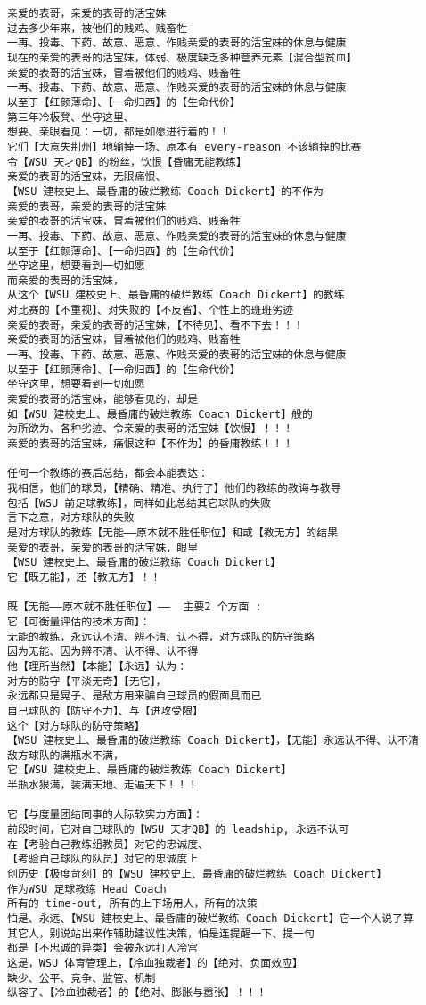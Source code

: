\documentclass[9pt, b5paper]{article}
\begin{document}
\begin{verbatim}
亲爱的表哥，亲爱的表哥的活宝妹
过去多少年来，被他们的贱鸡、贱畜牲
一再、投毒、下药、故意、恶意、作贱亲爱的表哥的活宝妹的休息与健康
现在的亲爱的表哥的活宝妹，体弱、极度缺乏多种营养元素【混合型贫血】
亲爱的表哥的活宝妹，冒着被他们的贱鸡、贱畜牲
一再、投毒、下药、故意、恶意、作贱亲爱的表哥的活宝妹的休息与健康
以至于【红颜薄命】、【一命归西】的【生命代价】
第三年冷板凳、坐守这里、
想要、亲眼看见：一切，都是如愿进行着的！！
它们【大意失荆州】地输掉一场、原本有 every-reason 不该输掉的比赛
令【WSU 天才QB】的粉丝，饮恨【昏庸无能教练】
亲爱的表哥的活宝妹，无限痛恨、
【WSU 建校史上、最昏庸的破烂教练 Coach Dickert】的不作为
亲爱的表哥，亲爱的表哥的活宝妹 
亲爱的表哥的活宝妹，冒着被他们的贱鸡、贱畜牲
一再、投毒、下药、故意、恶意、作贱亲爱的表哥的活宝妹的休息与健康
以至于【红颜薄命】、【一命归西】的【生命代价】
坐守这里，想要看到一切如愿
而亲爱的表哥的活宝妹，
从这个【WSU 建校史上、最昏庸的破烂教练 Coach Dickert】的教练
对比赛的【不重视】、对失败的【不反省】、个性上的班班劣迹
亲爱的表哥，亲爱的表哥的活宝妹，【不待见】、看不下去！！！
亲爱的表哥的活宝妹，冒着被他们的贱鸡、贱畜牲
一再、投毒、下药、故意、恶意、作贱亲爱的表哥的活宝妹的休息与健康
以至于【红颜薄命】、【一命归西】的【生命代价】
坐守这里，想要看到一切如愿
亲爱的表哥的活宝妹，能够看见的，却是
如【WSU 建校史上、最昏庸的破烂教练 Coach Dickert】般的
为所欲为、各种劣迹、令亲爱的表哥的活宝妹【饮恨】！！！
亲爱的表哥的活宝妹，痛恨这种【不作为】的昏庸教练！！！

任何一个教练的赛后总结，都会本能表达：
我相信，他们的球员，【精确、精准、执行了】他们的教练的教诲与教导
包括【WSU 前足球教练】，同样如此总结其它球队的失败
言下之意，对方球队的失败
是对方球队的教练【无能——原本就不胜任职位】和或【教无方】的结果
亲爱的表哥，亲爱的表哥的活宝妹，眼里
【WSU 建校史上、最昏庸的破烂教练 Coach Dickert】
它【既无能】，还【教无方】！！

既【无能——原本就不胜任职位】——  主要2 个方面 :
它【可衡量评估的技术方面】：
无能的教练，永远认不清、辨不清、认不得，对方球队的防守策略
因为无能、因为辨不清、认不得、认不得
他【理所当然】【本能】【永远】认为：
对方的防守【平淡无奇】【无它】，
永远都只是晃子、是敌方用来骗自己球员的假面具而已
自己球队的【防守不力】、与【进攻受限】
这个【对方球队的防守策略】
【WSU 建校史上、最昏庸的破烂教练 Coach Dickert】，【无能】永远认不得、认不清
敌方球队的满瓶水不满，
它【WSU 建校史上、最昏庸的破烂教练 Coach Dickert】
半瓶水狠满，装满天地、走遍天下！！！

它【与度量团结同事的人际软实力方面】：
前段时间，它对自己球队的【WSU 天才QB】的 leadship, 永远不认可
在【考验自己教练组教员】对它的忠诚度、
【考验自己球队的队员】对它的忠诚度上
创历史【极度苛刻】的【WSU 建校史上、最昏庸的破烂教练 Coach Dickert】
作为WSU 足球教练 Head Coach
所有的 time-out, 所有的上下场用人，所有的决策
怕是、永远、【WSU 建校史上、最昏庸的破烂教练 Coach Dickert】它一个人说了算
其它人，别说站出来作辅助建议性决策，怕是连提醒一下、提一句
都是【不忠诚的异类】会被永远打入冷宫
这是，WSU 体育管理上，【冷血独裁者】的【绝对、负面效应】
缺少、公平、竞争、监管、机制
纵容了、【冷血独裁者】的【绝对、膨胀与嚣张】！！！


\end{verbatim}
\end{document}
